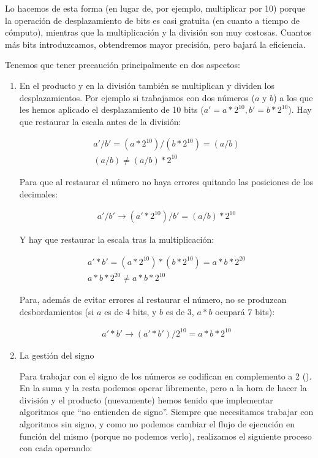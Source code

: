 Lo hacemos de esta forma (en lugar de, por ejemplo, multiplicar por 10) porque la operación de desplazamiento de bits es casi gratuita (en cuanto a tiempo de cómputo), mientras que la multiplicación y la división son muy costosas. Cuantos más bits introduzcamos, obtendremos mayor precisión, pero bajará la eficiencia.

Tenemos que tener precaución principalmente en dos aspectos:

\begin{enumerate}

  \item En el producto y en la división también se multiplican y dividen los desplazamientos. Por ejemplo si trabajamos con dos números ($a$ y $b$) a los que les hemos aplicado el desplazamiento de 10 bits ($ a' = a * 2^{10}, b' = b * 2^{10} $). Hay que restaurar la escala antes de la división:

  \begin{gather}
    \label{form:float_bits_product}
    a' / b' = ( a * 2^{10} ) / ( b * 2^{10} ) = (a / b) \\
    (a / b) \neq (a / b) * 2^{10}
  \end{gather}

  Para que al restaurar el número no haya errores quitando las posiciones de los decimales:

  \begin{gather}
    a' / b' \rightarrow (a' * 2^{10})/b' = (a / b) * 2^{10}
  \end{gather}

  Y hay que restaurar la escala tras la multiplicación:

  \begin{gather}
    a' * b' = ( a * 2^{10} ) * ( b * 2^{10} ) = a * b * 2^{20} \\
    a * b * 2^{20} \neq a * b * 2^{10}
  \end{gather}

  Para, además de evitar errores al restaurar el número, no se produzcan desbordamientos (si $a$ es de 4 bits, y $b$ es de 3, $ a * b $ ocupará 7 bits):

  \begin{gather}
    a' * b' \rightarrow (a' * b') / 2^{10} = a * b * 2^{10}
  \end{gather}

  \item La gestión del signo

  Para trabajar con el signo de los números se codifican en complemento a 2 (\cite{wikipedia_contributors._complemento_2019}). En la suma y la resta podemos operar libremente, pero a la hora de hacer la división y el producto (nuevamente) hemos tenido que implementar algoritmos que ``no entienden de signo''.  Siempre que necesitamos trabajar con algoritmos sin signo, y como no podemos cambiar el flujo de ejecución en función del mismo (porque no podemos verlo), realizamos el siguiente proceso con cada operando:


\end{enumerate}
